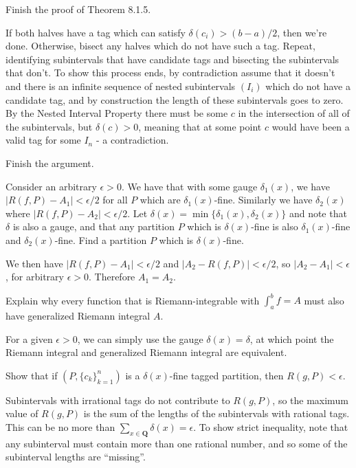 \begin{exercise}
Finish the proof of Theorem 8.1.5.
\end{exercise}
\begin{solution}
If both halves have a tag which can satisfy \(\delta(c_i) > (b-a)/2\), then we're done. Otherwise, bisect any halves which do not have such a tag. Repeat, identifying subintervals that have candidate tags and bisecting the subintervals that don't. To show this process ends, by contradiction assume that it doesn't and there is an infinite sequence of nested subintervals \((I_i)\) which do not have a candidate tag, and by construction the length of these subintervals goes to zero. By the Nested Interval Property there must be some \(c\) in the intersection of all of the subintervals, but \(\delta(c) > 0\), meaning that at some point \(c\) would have been a valid tag for some \(I_n\) - a contradiction.
\end{solution}

\begin{exercise}
Finish the argument.
\end{exercise}
\begin{solution}
Consider an arbitrary \(\epsilon > 0\). We have that with some gauge \(\delta_1(x)\), we have \(|R(f,P) - A_1| < \epsilon / 2\) for all \(P\) which are \(\delta_1(x)\)-fine. Similarly we have \(\delta_2(x)\) where \(|R(f,P) - A_2| < \epsilon / 2\). Let \(\delta(x) = \min\{\delta_1(x), \delta_2(x)\}\) and note that \(\delta\) is also a gauge, and that any partition \(P\) which is \(\delta(x)\)-fine is also \(\delta_1(x)\)-fine and \(\delta_2(x)\)-fine. Find a partition \(P\) which is \(\delta(x)\)-fine.

We then have \(|R(f,P) - A_1| < \epsilon/2\) and \(|A_2 - R(f,P)| < \epsilon/2\), so \(|A_2 - A_1| < \epsilon\), for arbitrary \(\epsilon > 0\). Therefore \(A_1 = A_2\).
\end{solution}

\begin{exercise}
Explain why every function that is Riemann-integrable with \(\int^b_a f = A\) must also have generalized Riemann integral \(A\).
\end{exercise}
\begin{solution}
For a given \(\epsilon > 0\), we can simply use the gauge \(\delta(x) = \delta\), at which point the Riemann integral and generalized Riemann integral are equivalent.
\end{solution}

\begin{exercise}
Show that if \((P, \{c_k\}^n_{k=1})\) is a \(\delta(x)\)-fine tagged partition, then \(R(g,P) < \epsilon\).
\end{exercise}
\begin{solution}
Subintervals with irrational tags do not contribute to \(R(g,P)\), so the maximum value of \(R(g,P)\) is the sum of the lengths of the subintervals with rational tags. This can be no more than \(\sum_{x \in \mathbf{Q}} \delta(x) = \epsilon\). To show strict inequality, note that any subinterval must contain more than one rational number, and so some of the subinterval lengths are ``missing''.
\end{solution}
